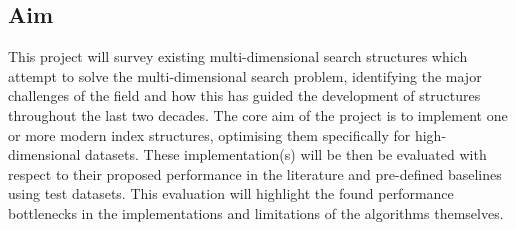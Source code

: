 \subsection{Aim}

This project will survey existing multi-dimensional search structures which attempt to solve the multi-dimensional search problem, identifying the major challenges of the field and how this has guided the development of structures throughout the last two decades. The core aim of the project is to implement one or more modern index structures, optimising them specifically for high-dimensional datasets. These implementation(s) will be then be evaluated with respect to their proposed performance in the literature and pre-defined baselines using test datasets. This evaluation will highlight the found performance bottlenecks in the implementations and limitations of the algorithms themselves.
